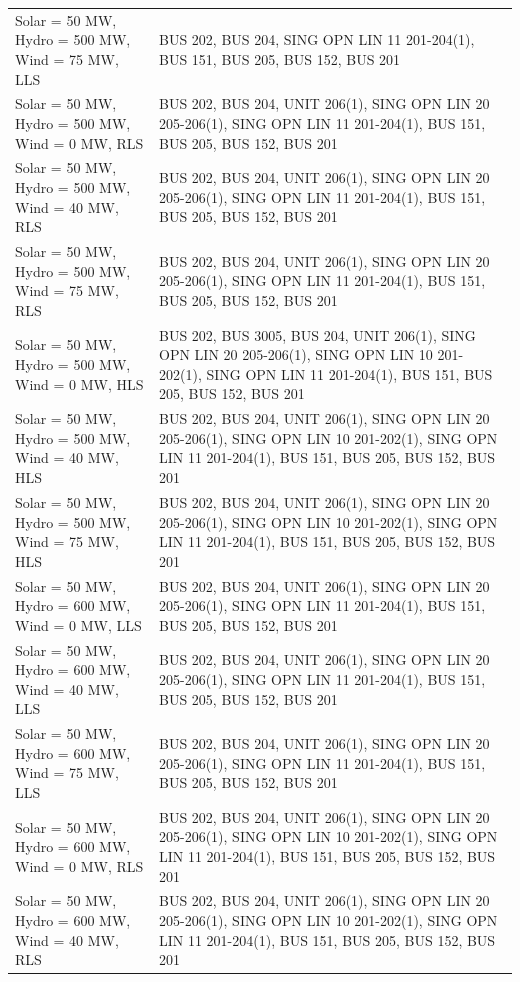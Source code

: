 \documentclass[10pt]{report}
\begin{document}
\begin{table}[H]
{\begin{tabular}{lp{15cm}}
Solar = 50 MW, Hydro = 500 MW, Wind = 75 MW, LLS & BUS 202, BUS 204, SING OPN LIN   11 201-204(1), BUS 151, BUS 205, BUS 152, BUS 201 \\
Solar = 50 MW, Hydro = 500 MW, Wind = 0 MW, RLS & BUS 202, BUS 204, UNIT 206(1), SING OPN LIN   20 205-206(1), SING OPN LIN   11 201-204(1), BUS 151, BUS 205, BUS 152, BUS 201 \\
Solar = 50 MW, Hydro = 500 MW, Wind = 40 MW, RLS & BUS 202, BUS 204, UNIT 206(1), SING OPN LIN   20 205-206(1), SING OPN LIN   11 201-204(1), BUS 151, BUS 205, BUS 152, BUS 201 \\
Solar = 50 MW, Hydro = 500 MW, Wind = 75 MW, RLS & BUS 202, BUS 204, UNIT 206(1), SING OPN LIN   20 205-206(1), SING OPN LIN   11 201-204(1), BUS 151, BUS 205, BUS 152, BUS 201 \\
Solar = 50 MW, Hydro = 500 MW, Wind = 0 MW, HLS & BUS 202, BUS 3005, BUS 204, UNIT 206(1), SING OPN LIN   20 205-206(1), SING OPN LIN   10 201-202(1), SING OPN LIN   11 201-204(1), BUS 151, BUS 205, BUS 152, BUS 201 \\
Solar = 50 MW, Hydro = 500 MW, Wind = 40 MW, HLS & BUS 202, BUS 204, UNIT 206(1), SING OPN LIN   20 205-206(1), SING OPN LIN   10 201-202(1), SING OPN LIN   11 201-204(1), BUS 151, BUS 205, BUS 152, BUS 201 \\
Solar = 50 MW, Hydro = 500 MW, Wind = 75 MW, HLS & BUS 202, BUS 204, UNIT 206(1), SING OPN LIN   20 205-206(1), SING OPN LIN   10 201-202(1), SING OPN LIN   11 201-204(1), BUS 151, BUS 205, BUS 152, BUS 201 \\
Solar = 50 MW, Hydro = 600 MW, Wind = 0 MW, LLS & BUS 202, BUS 204, UNIT 206(1), SING OPN LIN   20 205-206(1), SING OPN LIN   11 201-204(1), BUS 151, BUS 205, BUS 152, BUS 201 \\
Solar = 50 MW, Hydro = 600 MW, Wind = 40 MW, LLS & BUS 202, BUS 204, UNIT 206(1), SING OPN LIN   20 205-206(1), SING OPN LIN   11 201-204(1), BUS 151, BUS 205, BUS 152, BUS 201 \\
Solar = 50 MW, Hydro = 600 MW, Wind = 75 MW, LLS & BUS 202, BUS 204, UNIT 206(1), SING OPN LIN   20 205-206(1), SING OPN LIN   11 201-204(1), BUS 151, BUS 205, BUS 152, BUS 201 \\
Solar = 50 MW, Hydro = 600 MW, Wind = 0 MW, RLS & BUS 202, BUS 204, UNIT 206(1), SING OPN LIN   20 205-206(1), SING OPN LIN   10 201-202(1), SING OPN LIN   11 201-204(1), BUS 151, BUS 205, BUS 152, BUS 201 \\
Solar = 50 MW, Hydro = 600 MW, Wind = 40 MW, RLS & BUS 202, BUS 204, UNIT 206(1), SING OPN LIN   20 205-206(1), SING OPN LIN   10 201-202(1), SING OPN LIN   11 201-204(1), BUS 151, BUS 205, BUS 152, BUS 201 \\

\end{tabular}}
\end{table}
\end{document}
